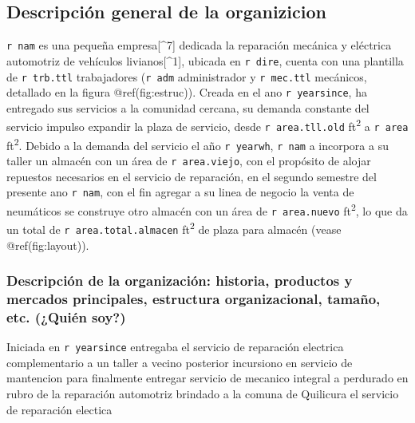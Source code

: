 \documentclass[11pt]{article}
\begin{document}
\hypertarget{descripciuxf3n-general-de-la-organizicion}{%
\subsection{Descripción general de la
organizicion}\label{descripciuxf3n-general-de-la-organizicion}}

\texttt{r\ nam} es una pequeña empresa{[}\^{}7{]} dedicada la reparación
mecánica y eléctrica automotriz de vehículos livianos{[}\^{}1{]},
ubicada en \texttt{r\ dire}, cuenta con una plantilla de
\texttt{r\ trb.ttl} trabajadores (\texttt{r\ adm} administrador y
\texttt{r\ mec.ttl} mecánicos, detallado en la figura @ref(fig:estruc)).
Creada en el ano \texttt{r\ yearsince}, ha entregado sus servicios a la
comunidad cercana, su demanda constante del servicio impulso expandir la
plaza de servicio, desde \texttt{r\ area.tll.old} ft\textsuperscript{2}
a \texttt{r\ area} ft\textsuperscript{2}. Debido a la demanda del
servicio el año \texttt{r\ yearwh}, \texttt{r\ nam} a incorpora a su
taller un almacén con un área de \texttt{r\ area.viejo}, con el
propósito de alojar repuestos necesarios en el servicio de reparación,
en el segundo semestre del presente ano \texttt{r\ nam}, con el fin
agregar a su linea de negocio la venta de neumáticos se construye otro
almacén con un área de \texttt{r\ area.nuevo} ft\textsuperscript{2}, lo
que da un total de \texttt{r\ area.total.almacen} ft\textsuperscript{2}
de plaza para almacén (vease @ref(fig:layout)).

\hypertarget{descripciuxf3n-de-la-organizaciuxf3n-historia-productos-y-mercados-principales-estructura-organizacional-tamauxf1o-etc.-quiuxe9n-soy}{%
\subsubsection{Descripción de la organización: historia, productos y
mercados principales, estructura organizacional, tamaño, etc. (¿Quién
soy?)}\label{descripciuxf3n-de-la-organizaciuxf3n-historia-productos-y-mercados-principales-estructura-organizacional-tamauxf1o-etc.-quiuxe9n-soy}}

Iniciada en \texttt{r\ yearsince} entregaba el servicio de reparación
electrica complementario a un taller a vecino posterior incursiono en
servicio de mantencion para finalmente entregar servicio de mecanico
integral a perdurado en rubro de la reparación automotriz brindado a la
comuna de Quilicura el servicio de reparación electica
\end{document}
